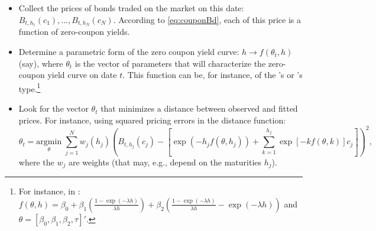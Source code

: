 \documentclass[
  12pt,
]{book}
\providecommand{\tightlist}{%
  \setlength{\itemsep}{0pt}\setlength{\parskip}{0pt}}
\theoremstyle{definition}
\theoremstyle{definition}
\theoremstyle{definition}
\theoremstyle{definition}
\theoremstyle{remark}
\begin{document}
\begin{itemize}
\tightlist
\item
  Collect the prices of bonds traded on the market on this date: \(B_{t,h_1}(c_1),\dots,B_{t,h_N}(c_N)\). According to \eqref{eq:couponBd}, each of this price is a function of zero-coupon yields.
\item
  Determine a parametric form of the zero coupon yield curve: \(h \rightarrow f(\theta_t,h)\) (say), where \(\theta_t\) is the vector of parameters that will characterize the zero-coupon yield curve on date \(t\). This function can be, for instance, of the \citet{Nelson_Siegel_1987}'s or \citet{Svensson_1994}'s type.\footnote{For instance, in \citet{Nelson_Siegel_1987}: \(f(\theta,h) = \beta_0 + \beta_1\left(\frac{1 - \exp(-\lambda h)}{\lambda h}\right)+\beta_2\left(\frac{1 - \exp(-\lambda h)}{\lambda h}-\exp(-\lambda h)\right)\) and \(\theta = [\beta_0,\beta_1,\beta_2,\tau]'\).}
\item
  Look for the vector \(\theta_t\) that minimizes a distance between observed and fitted prices. For instance, using squared pricing errors in the distance function:
  \[
  \theta_t = \underset{\theta}{\mbox{argmin}}\;  \sum_{j=1}^N w_j(h_j)\left(B_{t,h_j}(c_j) - \left[\exp(-h_j f(\theta,h_j)) + \sum_{k=1}^{h_j} \exp\left[-k f(\theta,k)\right]c_j\right]\right)^2,
  \]
  where the \(w_j\) are weights (that may, e.g., depend on the maturities \(h_j\)).
\end{itemize}
\end{document}

